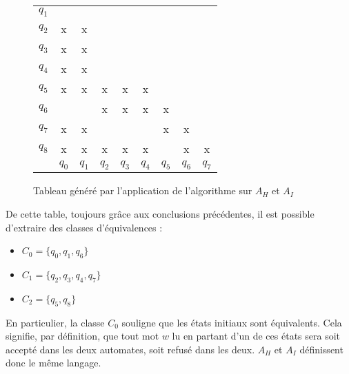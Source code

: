 \begin{figure}[H]
 \centering
 \begin{tabular}{ccccccccc}
	 \cline{2-2}
	 \multicolumn{1}{c|}{$q_1$}&\multicolumn{1}{c|}{} &&&&&&&\\
	 \cline{2-3}
	 \multicolumn{1}{c|}{$q_2$}&\multicolumn{1}{c|}{x} &\multicolumn{1}{c|}{x}&&&&&&\\
	 \cline{2-4}
	 \multicolumn{1}{c|}{$q_3$}&\multicolumn{1}{c|}{x}&\multicolumn{1}{c|}{x}&\multicolumn{1}{c|}{}&&&&&\\
	 \cline{2-5}
	 \multicolumn{1}{c|}{$q_4$}&\multicolumn{1}{c|}{x}&\multicolumn{1}{c|}{x}&\multicolumn{1}{c|}{}&\multicolumn{1}{c|}{}&&&&\\
	 \cline{2-6}
	 \multicolumn{1}{c|}{$q_5$}&\multicolumn{1}{c|}{x}&\multicolumn{1}{c|}{x}&\multicolumn{1}{c|}{x}&\multicolumn{1}{c|}{x}&\multicolumn{1}{c|}{x}&&&\\
	 \cline{2-7}
	 \multicolumn{1}{c|}{$q_6$}&\multicolumn{1}{c|}{}&\multicolumn{1}{c|}{}&\multicolumn{1}{c|}{x}&\multicolumn{1}{c|}{x}&\multicolumn{1}{c|}{x}&\multicolumn{1}{c|}{x}&&\\
	 \cline{2-8}
	 \multicolumn{1}{c|}{$q_7$}&\multicolumn{1}{c|}{x}&\multicolumn{1}{c|}{x}&\multicolumn{1}{c|}{}&\multicolumn{1}{c|}{}&\multicolumn{1}{c|}{}&\multicolumn{1}{c|}{x}&\multicolumn{1}{c|}{x}&\\
	 \cline{2-9}
	 \multicolumn{1}{c|}{$q_8$}&\multicolumn{1}{c|}{x}&\multicolumn{1}{c|}{x}&\multicolumn{1}{c|}{x}&\multicolumn{1}{c|}{x}&\multicolumn{1}{c|}{x}&\multicolumn{1}{c|}{}&\multicolumn{1}{c|}{x}&\multicolumn{1}{c|}{x}\\
	 \cline{2-9}
	 \multicolumn{1}{c}{} & $q_0$& $q_1$ & $q_2$ & $q_3$ & $q_4$ & $q_5$ & $q_6$ & $q_7$\\

 \end{tabular}
 \caption{Tableau généré par l'application de l'algorithme sur $A_H$ et $A_I$}\label{fig:tahi}
\end{figure}

De cette table, toujours grâce aux conclusions précédentes, il est possible d'extraire des classes d'équivalences :
\begin{itemize}
 \item $C_0 = \{q_0, q_1, q_6\}$
 \item $C_1 = \{q_2, q_3, q_4, q_7\}$
 \item $C_2 = \{q_5, q_8\}$
\end{itemize}

En particulier, la classe $C_0$ souligne que les états initiaux sont équivalents. Cela signifie, par définition, que tout mot $w$ lu en partant d'un de ces états sera soit accepté dans les deux automates, soit refusé dans les deux. $A_H$ et $A_I$ définissent donc le même langage.

